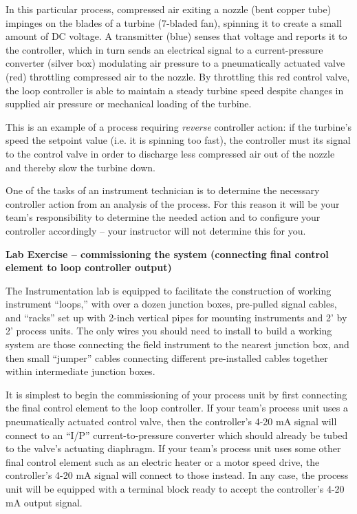 In this particular process, compressed air exiting a nozzle (bent copper tube) impinges on the blades of a turbine (7-bladed fan), spinning it to create a small amount of DC voltage.  A transmitter (blue) senses that voltage and reports it to the controller, which in turn sends an electrical signal to a current-pressure converter (silver box) modulating air pressure to a pneumatically actuated valve (red) throttling compressed air to the nozzle.  By throttling this red control valve, the loop controller is able to maintain a steady turbine speed despite changes in supplied air pressure or mechanical loading of the turbine.

\vskip 10pt

This is an example of a process requiring {\it reverse} controller action: if the turbine's speed  the setpoint value (i.e. it is spinning too fast), the controller must  its signal to the control valve in order to discharge less compressed air out of the nozzle and thereby slow the turbine down.

\vskip 10pt

One of the tasks of an instrument technician is to determine the necessary controller action from an analysis of the process.  For this reason it will be your team's responsibility to determine the needed action and to configure your controller accordingly -- your instructor will not determine this for you.











\vfil \eject

\noindent
{\bf Lab Exercise -- commissioning the system (connecting final control element to loop controller output)}

\vskip 5pt

The Instrumentation lab is equipped to facilitate the construction of working instrument ``loops,'' with over a dozen junction boxes, pre-pulled signal cables, and ``racks'' set up with 2-inch vertical pipes for mounting instruments and 2' by 2' process units.  The only wires you should need to install to build a working system are those connecting the field instrument to the nearest junction box, and then small ``jumper'' cables connecting different pre-installed cables together within intermediate junction boxes.

It is simplest to begin the commissioning of your process unit by first connecting the final control element to the loop controller.  If your team's process unit uses a pneumatically actuated control valve, then the controller's 4-20 mA signal will connect to an ``I/P'' current-to-pressure converter which should already be tubed to the valve's actuating diaphragm.  If your team's process unit uses some other final control element such as an electric heater or a motor speed drive, the controller's 4-20 mA signal will connect to those instead.  In any case, the process unit will be equipped with a terminal block ready to accept the controller's 4-20 mA output signal.


